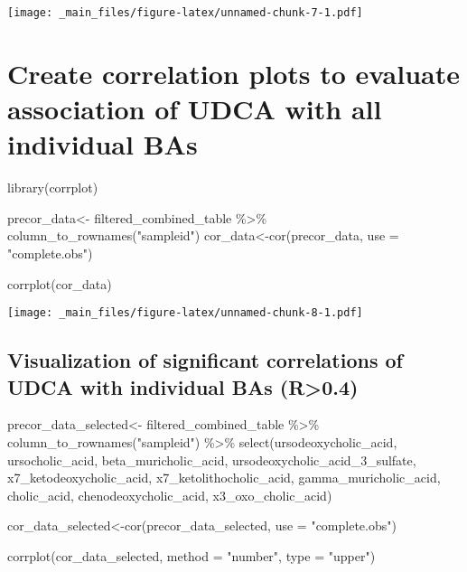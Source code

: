 \documentclass[
]{book}
\newenvironment{Shaded}{\begin{snugshade}}{\end{snugshade}}
\newcommand{\AttributeTok}[1]{\textcolor[rgb]{0.77,0.63,0.00}{#1}}
\newcommand{\FunctionTok}[1]{\textcolor[rgb]{0.00,0.00,0.00}{#1}}
\newcommand{\NormalTok}[1]{#1}
\newcommand{\OtherTok}[1]{\textcolor[rgb]{0.56,0.35,0.01}{#1}}
\newcommand{\SpecialCharTok}[1]{\textcolor[rgb]{0.00,0.00,0.00}{#1}}
\newcommand{\StringTok}[1]{\textcolor[rgb]{0.31,0.60,0.02}{#1}}
\begin{document}
\texttt{[image: \_main\_files/figure-latex/unnamed-chunk-7-1.pdf]}

\hypertarget{create-correlation-plots-to-evaluate-association-of-udca-with-all-individual-bas}{%
\section{Create correlation plots to evaluate association of UDCA with all individual BAs}\label{create-correlation-plots-to-evaluate-association-of-udca-with-all-individual-bas}}

\begin{Shaded}
\begin{Highlighting}[]
\FunctionTok{library}\NormalTok{(corrplot)}

\NormalTok{precor\_data}\OtherTok{\textless{}{-}}\NormalTok{ filtered\_combined\_table }\SpecialCharTok{\%\textgreater{}\%} 
  \FunctionTok{column\_to\_rownames}\NormalTok{(}\StringTok{"sampleid"}\NormalTok{)}
\NormalTok{cor\_data}\OtherTok{\textless{}{-}}\FunctionTok{cor}\NormalTok{(precor\_data, }\AttributeTok{use =} \StringTok{"complete.obs"}\NormalTok{)}

\FunctionTok{corrplot}\NormalTok{(cor\_data)}
\end{Highlighting}
\end{Shaded}

\texttt{[image: \_main\_files/figure-latex/unnamed-chunk-8-1.pdf]}

\hypertarget{visualization-of-significant-correlations-of-udca-with-individual-bas-r0.4}{%
\subsection{Visualization of significant correlations of UDCA with individual BAs (R\textgreater0.4)}\label{visualization-of-significant-correlations-of-udca-with-individual-bas-r0.4}}

\begin{Shaded}
\begin{Highlighting}[]
\NormalTok{precor\_data\_selected}\OtherTok{\textless{}{-}}\NormalTok{ filtered\_combined\_table }\SpecialCharTok{\%\textgreater{}\%} 
  \FunctionTok{column\_to\_rownames}\NormalTok{(}\StringTok{"sampleid"}\NormalTok{) }\SpecialCharTok{\%\textgreater{}\%} 
  \FunctionTok{select}\NormalTok{(ursodeoxycholic\_acid, ursocholic\_acid, beta\_muricholic\_acid, ursodeoxycholic\_acid\_3\_sulfate, x7\_ketodeoxycholic\_acid, }
\NormalTok{         x7\_ketolithocholic\_acid, gamma\_muricholic\_acid, cholic\_acid, chenodeoxycholic\_acid, x3\_oxo\_cholic\_acid)}

\NormalTok{cor\_data\_selected}\OtherTok{\textless{}{-}}\FunctionTok{cor}\NormalTok{(precor\_data\_selected, }\AttributeTok{use =} \StringTok{"complete.obs"}\NormalTok{)}

\FunctionTok{corrplot}\NormalTok{(cor\_data\_selected, }\AttributeTok{method =} \StringTok{"number"}\NormalTok{, }\AttributeTok{type =} \StringTok{"upper"}\NormalTok{)}
\end{Highlighting}
\end{Shaded}
\end{document}
